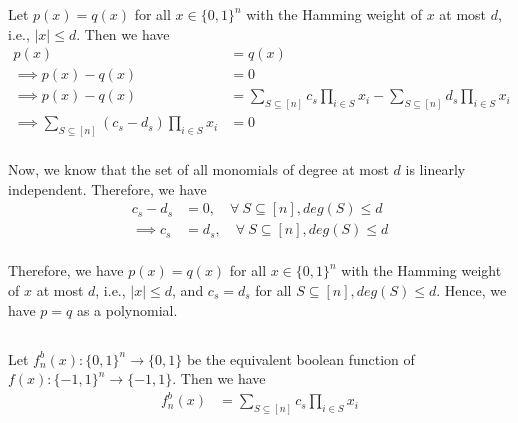 \documentclass{article}
\begin{document}
Let $p(x) = q(x)$ for all $x \in{ \{0, 1\}}^n$ with the Hamming weight of $x$ at most $d$, i.e., $|x| \leq d$. Then we have
\begin{align*}
	p(x) &= q(x) \\
	\implies p(x) - q(x) &= 0 \\
	\implies p(x) - q(x) &= \sum_{S \subseteq [n]} c_s \prod_{i \in S} x_i - \sum_{S \subseteq [n]} d_s \prod_{i \in S} x_i \\
	\implies \sum_{S \subseteq [n]} (c_s - d_s) \prod_{i \in S} x_i &= 0 \\
\end{align*}

\noindent
Now, we know that the set of all monomials of degree at most $d$ is linearly independent. Therefore, we have
\begin{align*}
	c_s - d_s &= 0, \quad \forall\ S \subseteq [n], deg(S) \leq d \\
\implies c_s &= d_s, \quad \forall\ S \subseteq [n], deg(S) \leq d \\
\end{align*}

\noindent
Therefore, we have $p(x) = q(x)$ for all $x \in{ \{0, 1\}}^n$ with the Hamming weight of $x$ at most $d$, i.e., $|x| \leq d$, and $c_s = d_s$ for all $S \subseteq [n], deg(S) \leq d$. Hence, we have $p = q$ as a polynomial. \begin{flushright}\qedsymbol\end{flushright}


\subsection{}

\subsubsection{}
\vspace*{-8mm}

Let $f^b_n(x): {\{0, 1\}}^n \rightarrow \{0, 1\}$ be the equivalent boolean function of $f(x): {\{-1, 1\}}^n \rightarrow \{-1, 1\}$. Then we have
\begin{align*}
	f^b_n(x) &= \sum_{S \subseteq [n]} c_s \prod_{i \in S} x_i \\
\end{align*}
\end{document}
